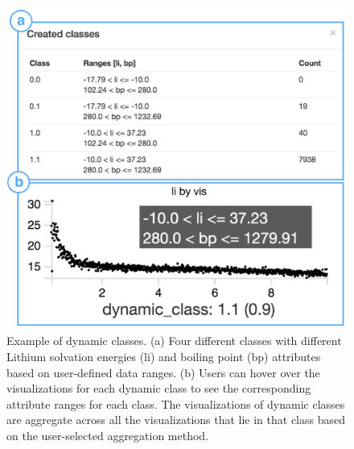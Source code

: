 \begin{figure}[ht!]
\centering
\includegraphics[width=0.7\linewidth]{figures/dcc_example.png}
\vspace{-6pt}
\caption{Example of dynamic classes. (a) Four different classes with different Lithium solvation energies (li) and boiling point (bp) attributes based on user-defined data ranges. (b) Users can hover over the visualizations for each dynamic class to see the corresponding attribute ranges for each class. The visualizations of dynamic classes are aggregate across all the visualizations that lie in that class based on the user-selected aggregation method.}
\label{dcc}
\end{figure}
